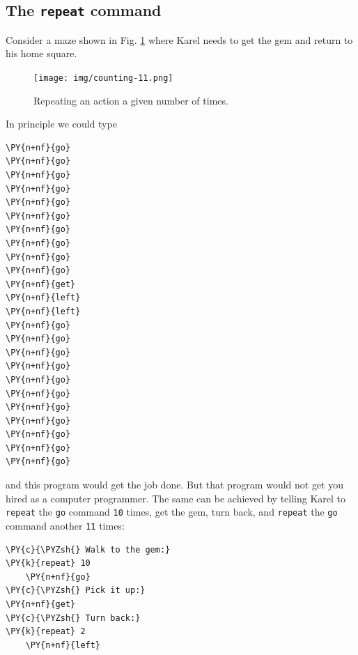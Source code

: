 \subsection{The {\tt repeat} command}

Consider a maze shown in Fig. \ref{fig:counting-11} where Karel needs to 
get the gem and return to his home square. 

\begin{figure}[!ht]
\begin{center}
\texttt{[image: img/counting-11.png]}
\vspace{-0mm}
\caption{Repeating an action a given number of times.}
\label{fig:counting-11}
\end{center}
\end{figure}

\noindent
In principle we could type\\

\begin{bbox}
\begin{Verbatim}[commandchars=\\\{\}]
\PY{n+nf}{go}
\PY{n+nf}{go}
\PY{n+nf}{go}
\PY{n+nf}{go}
\PY{n+nf}{go}
\PY{n+nf}{go}
\PY{n+nf}{go}
\PY{n+nf}{go}
\PY{n+nf}{go}
\PY{n+nf}{go}
\PY{n+nf}{get}
\PY{n+nf}{left}
\PY{n+nf}{left}
\PY{n+nf}{go}
\PY{n+nf}{go}
\PY{n+nf}{go}
\PY{n+nf}{go}
\PY{n+nf}{go}
\PY{n+nf}{go}
\PY{n+nf}{go}
\PY{n+nf}{go}
\PY{n+nf}{go}
\PY{n+nf}{go}
\PY{n+nf}{go}
\end{Verbatim}
\end{bbox}
\vspace{6mm}

\noindent
and this program would get the job done. But that program would not get you hired as a computer
programmer. The same can be achieved by telling Karel to {\tt repeat} the {\tt go} 
command {\tt 10} times, get the gem, turn back, and  {\tt repeat} the {\tt go} 
command another {\tt 11} times:\\

\begin{bbox}
\begin{Verbatim}[commandchars=\\\{\}]
\PY{c}{\PYZsh{} Walk to the gem:}
\PY{k}{repeat} 10
    \PY{n+nf}{go}
\PY{c}{\PYZsh{} Pick it up:}
\PY{n+nf}{get}
\PY{c}{\PYZsh{} Turn back:}
\PY{k}{repeat} 2
    \PY{n+nf}{left}
\end{Verbatim}
\end{bbox}
\vspace{6mm}

